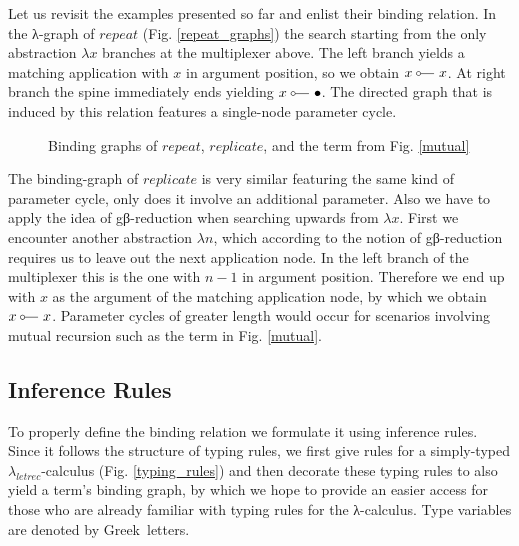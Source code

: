 \documentclass[submission,copyright,creativecommons]{eptcs}
\newcommand{\lambdaletrec}{\ensuremath{\lambda_\textit{letrec}}}
\newcommand\haskell[1]{\ensuremath{\mathit{#1}}}
\newcommand\binds{\mathrel{\scriptsize\fourier\hspace{-0.3em}}}
\newcommand\blackhole{\bullet}
\renewcommand\;{\,}
\begin{document}
Let us revisit the examples presented so far and enlist their binding
relation. In the λ-graph of \haskell{repeat} (Fig. \ref{repeat_graphs}) the
search starting from the only abstraction $λx$ branches at the multiplexer
above. The left branch yields a matching application with $x$ in argument
position, so we obtain $x \binds x$. At right branch the spine immediately
ends yielding $x \binds \blackhole$. The directed graph that is induced by
this relation features a single-node parameter cycle.

\begin{figure}[ht]
\hspace{2cm}
\hspace{2cm}
\caption{Binding graphs of \haskell{repeat}, \haskell{replicate}, and the term from Fig. \ref{mutual}}
\end{figure}

The binding-graph of \haskell{replicate} is very similar featuring the same
kind of parameter cycle, only does it involve an additional parameter. Also we
have to apply the idea of gβ-reduction when searching upwards from $λx$. First
we encounter another abstraction $λn$, which according to the notion of
gβ-reduction requires us to leave out the next application node. In the left
branch of the multiplexer this is the one with $n-1$ in argument position.
Therefore we end up with $x$ as the argument of the matching application node,
by which we obtain $x \binds x$. Parameter cycles of greater length would occur
for scenarios involving mutual recursion such as the term in Fig. \ref{mutual}.



\subsection{Inference Rules}

To properly define the binding relation we formulate it using inference rules.
Since it follows the structure of typing rules, we first give rules for a
simply-typed $\lambdaletrec$-calculus (Fig. \ref{typing_rules}) and then
decorate these typing rules to also yield a term's binding graph, by which we
hope to provide an easier access for those who are already familiar with typing
rules for the λ-calculus. Type variables are denoted by Greek~letters.
\end{document}
